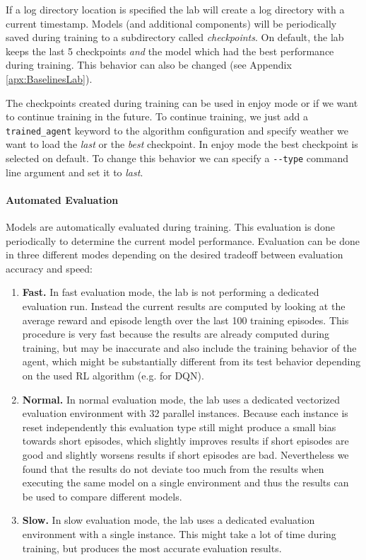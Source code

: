 If a log directory location is specified the lab will create a log directory with a current timestamp. Models (and additional components) will be periodically saved during training to a subdirectory called \textit{checkpoints}. On default, the lab keeps the last 5 checkpoints \textit{and} the model which had the best performance during training. This behavior can also be changed (see Appendix \ref{apx:BaselinesLab}).

The checkpoints created during training can be used in enjoy mode or if we want to continue training in the future. To continue training, we just add a \texttt{trained\_agent} keyword to the algorithm configuration and specify weather we want to load the \textit{last} or the \textit{best} checkpoint. In enjoy mode the best checkpoint is selected on default. To change this behavior we can specify a \texttt{-{}-type} command line argument and set it to \textit{last}.

\paragraph{Automated Evaluation}
Models are automatically evaluated during training. This evaluation is done periodically to determine the current model performance. Evaluation can be done in three different modes depending on the desired tradeoff between evaluation accuracy and speed:

\begin{enumerate}
    \item \textbf{Fast.} In fast evaluation mode, the lab is not performing a dedicated evaluation run. Instead the current results are computed by looking at the average reward and episode length over the last 100 training episodes. This procedure is very fast because the results are already computed during training, but may be inaccurate and also include the training behavior of the agent, which might be substantially different from its test behavior depending on the used RL algorithm (e.g. for DQN).
    \item \textbf{Normal.} In normal evaluation mode, the lab uses a dedicated vectorized evaluation environment with 32 parallel instances. Because each instance is reset independently this evaluation type still might produce a small bias towards short episodes, which slightly improves results if short episodes are good and slightly worsens results if short episodes are bad. Nevertheless we found that the results do not deviate too much from the results when executing the same model on a single environment and thus the results can be used to compare different models.
    \item \textbf{Slow.} In slow evaluation mode, the lab uses a dedicated evaluation environment with a single instance. This might take a lot of time during training, but produces the most accurate evaluation results. 
\end{enumerate}

